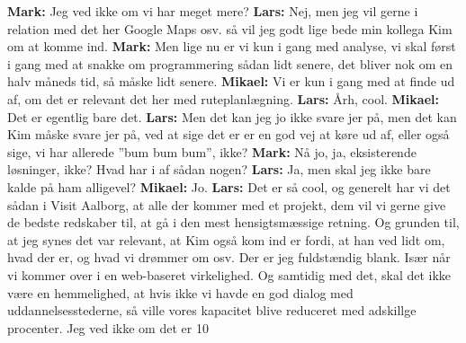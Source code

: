 \textbf{Mark:} Jeg ved ikke om vi har meget mere? \newline	
\textbf{Lars:} Nej, men jeg vil gerne i relation med det her Google Maps osv. så vil jeg godt lige bede min kollega Kim om at komme ind. \newline
\textbf{Mark:} Men lige nu er vi kun i gang med analyse, vi skal først i gang med at snakke om programmering sådan lidt senere, det bliver nok om en halv måneds tid, så måske lidt senere. \newline
\textbf{Mikael:} Vi er kun i gang med at finde ud af, om det er relevant det her med ruteplanlægning. \newline
\textbf{Lars:} Årh, cool. \newline
\textbf{Mikael:} Det er egentlig bare det. \newline 
\textbf{Lars:} Men det kan jeg jo ikke svare jer på, men det kan Kim måske svare jer på, ved at sige det er er en god vej at køre ud af, eller også sige, vi har allerede ”bum bum bum”, ikke? \newline
\textbf{Mark:} Nå jo, ja, eksisterende løsninger, ikke? Hvad har i af sådan nogen? \newline
\textbf{Lars:} Ja, men skal jeg ikke bare kalde på ham alligevel? \newline
\textbf{Mikael:} Jo. \newline
\textbf{Lars:} Det er så cool, og generelt har vi det sådan i Visit Aalborg, at alle der kommer med et projekt, dem vil vi gerne give de bedste redskaber til, at gå i den mest hensigtsmæssige retning. Og grunden til, at jeg synes det var relevant, at Kim også kom ind er fordi, at han ved lidt om, hvad der er, og hvad vi drømmer om osv. Der er jeg fuldstændig blank. Især når vi kommer over i en web-baseret virkelighed. Og samtidig med det, skal det ikke være en hemmelighed, at hvis ikke vi havde en god dialog med uddannelsesstederne, så ville vores kapacitet blive reduceret med adskillge procenter. Jeg ved ikke om det er 10%
